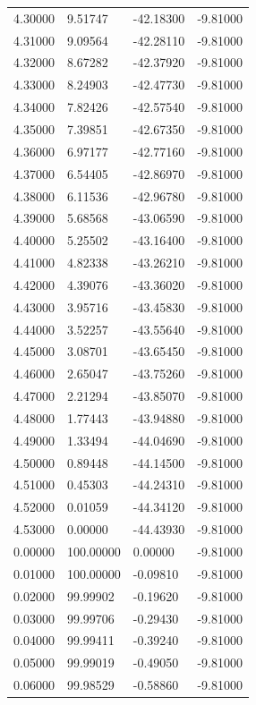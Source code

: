\begin{table}
\begin{tabular}{llll}
4.30000 & 9.51747 & -42.18300 & -9.81000 \\
4.31000 & 9.09564 & -42.28110 & -9.81000 \\
4.32000 & 8.67282 & -42.37920 & -9.81000 \\
4.33000 & 8.24903 & -42.47730 & -9.81000 \\
4.34000 & 7.82426 & -42.57540 & -9.81000 \\
4.35000 & 7.39851 & -42.67350 & -9.81000 \\
4.36000 & 6.97177 & -42.77160 & -9.81000 \\
4.37000 & 6.54405 & -42.86970 & -9.81000 \\
4.38000 & 6.11536 & -42.96780 & -9.81000 \\
4.39000 & 5.68568 & -43.06590 & -9.81000 \\
4.40000 & 5.25502 & -43.16400 & -9.81000 \\
4.41000 & 4.82338 & -43.26210 & -9.81000 \\
4.42000 & 4.39076 & -43.36020 & -9.81000 \\
4.43000 & 3.95716 & -43.45830 & -9.81000 \\
4.44000 & 3.52257 & -43.55640 & -9.81000 \\
4.45000 & 3.08701 & -43.65450 & -9.81000 \\
4.46000 & 2.65047 & -43.75260 & -9.81000 \\
4.47000 & 2.21294 & -43.85070 & -9.81000 \\
4.48000 & 1.77443 & -43.94880 & -9.81000 \\
4.49000 & 1.33494 & -44.04690 & -9.81000 \\
4.50000 & 0.89448 & -44.14500 & -9.81000 \\
4.51000 & 0.45303 & -44.24310 & -9.81000 \\
4.52000 & 0.01059 & -44.34120 & -9.81000 \\
4.53000 & 0.00000 & -44.43930 & -9.81000 \\
0.00000 & 100.00000 & 0.00000 & -9.81000 \\
0.01000 & 100.00000 & -0.09810 & -9.81000 \\
0.02000 & 99.99902 & -0.19620 & -9.81000 \\
0.03000 & 99.99706 & -0.29430 & -9.81000 \\
0.04000 & 99.99411 & -0.39240 & -9.81000 \\
0.05000 & 99.99019 & -0.49050 & -9.81000 \\
0.06000 & 99.98529 & -0.58860 & -9.81000 \\

\end{tabular}
\end{table}
